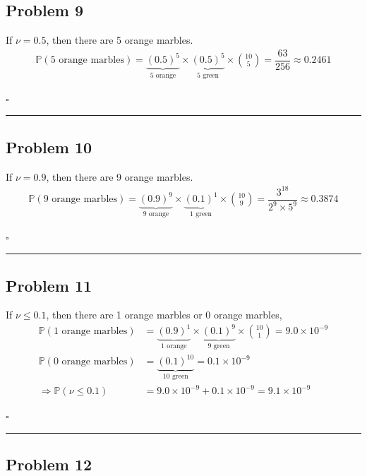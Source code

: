 \documentclass[12pt]{article}
\newcommand*{\QEDB}{\hfill\ensuremath{\square}}
\newcommand{\ParTh}[1]{\left(#1\right)}
\newcommand{\SciNum}[2]{#1\times{10}^{#2}}
\newcommand{\horrule}[1]{\rule{\linewidth}{#1}}
\begin{document}
\subsection*{Problem 9}

If $\nu = 0.5$, then there are 5 orange marbles.
\begin{align}
\mathbb{P}\ParTh{\text{5 orange marbles}}=\underbrace{\ParTh{0.5}^5}_{\text{5 orange}}\times\underbrace{\ParTh{0.5}^5}_{\text{5 green}}\times\binom{10}{5}=\dfrac{63}{256}\approx0.2461
\end{align}

\QEDB

\horrule{0.5pt}

\subsection*{Problem 10}

If $\nu = 0.9$, then there are 9 orange marbles.
\begin{align}
\mathbb{P}\ParTh{\text{9 orange marbles}}=\underbrace{\ParTh{0.9}^9}_{\text{9 orange}}\times\underbrace{\ParTh{0.1}^1}_{\text{1 green}}\times\binom{10}{9}=\dfrac{3^{18}}{2^9\times5^9}\approx0.3874
\end{align}

\QEDB

\horrule{0.5pt}

\subsection*{Problem 11}

If $\nu \leq 0.1$, then there are 1 orange marbles or 0 orange marbles,
\begin{align}
\mathbb{P}\ParTh{\text{1 orange marbles}}&=\underbrace{\ParTh{0.9}^1}_{\text{1 orange}}\times\underbrace{\ParTh{0.1}^9}_{\text{9 green}}\times\binom{10}{1}=\SciNum{9.0}{-9}\\
\mathbb{P}\ParTh{\text{0 orange marbles}}&=\underbrace{\ParTh{0.1}^{10}}_{\text{10 green}}=\SciNum{0.1}{-9}\\
\Rightarrow\mathbb{P}\ParTh{\nu\leq0.1}&=\SciNum{9.0}{-9}+\SciNum{0.1}{-9}=\SciNum{9.1}{-9}
\end{align}

\QEDB

\horrule{0.5pt}

\subsection*{Problem 12}
\end{document}
